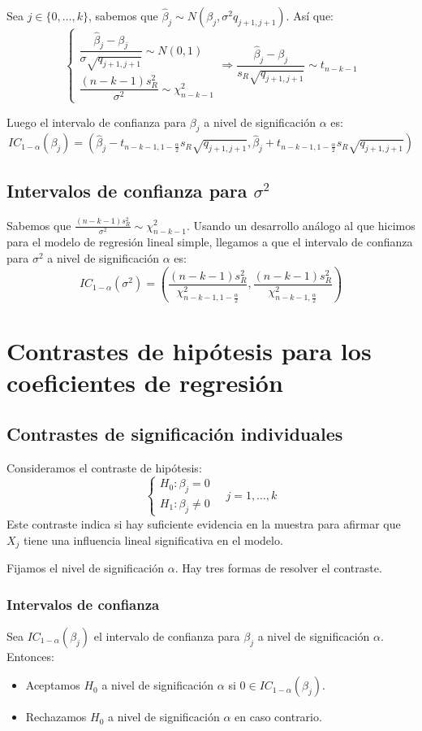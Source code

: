 Sea $j \in \{0, \dots, k\}$, sabemos que $\hat{\beta}_j \sim N(\beta_j, \sigma^2 q_{j+1, j+1})$.
Así que:
$$\begin{cases}
        \dfrac{\hat{\beta}_j - \beta_j}{\sigma \sqrt{q_{j+1, j+1}}} \sim N(0, 1) \\
        \dfrac{(n-k-1)s_R^2}{\sigma^2} \sim \chi^2_{n-k-1}
    \end{cases} \Rightarrow \frac{\hat{\beta}_j - \beta_j}{s_R \sqrt{q_{j+1, j+1}}} \sim t_{n-k-1}$$

Luego el intervalo de confianza para $\beta_j$ a nivel de significación $\alpha$ es:
$$IC_{1-\alpha}(\beta_j) = \left( \hat{\beta}_j - t_{n-k-1, 1-\frac{\alpha}{2}} s_R \sqrt{q_{j+1, j+1}}, \hat{\beta}_j + t_{n-k-1, 1-\frac{\alpha}{2}} s_R \sqrt{q_{j+1, j+1}} \right)$$

\subsection*{Intervalos de confianza para $\sigma^2$}
Sabemos que $\frac{(n-k-1)s_R^2}{\sigma^2} \sim \chi^2_{n-k-1}$.
Usando un desarrollo análogo al que hicimos para el modelo de regresión lineal simple, llegamos a que el intervalo de confianza para $\sigma^2$ a nivel de significación $\alpha$ es:
$$IC_{1-\alpha}(\sigma^2) = \left( \frac{(n-k-1)s_R^2}{\chi^2_{n-k-1, 1-\frac{\alpha}{2}}}, \frac{(n-k-1)s_R^2}{\chi^2_{n-k-1, \frac{\alpha}{2}}} \right)$$

\section{Contrastes de hipótesis para los coeficientes de regresión}
\subsection*{Contrastes de significación individuales}
Consideramos el contraste de hipótesis:
$$\begin{cases}
        H_0: \beta_j = 0 \\
        H_1: \beta_j \neq 0
    \end{cases} \quad j = 1, \dots, k$$
Este contraste indica si hay suficiente evidencia en la muestra para afirmar que $X_j$ tiene una influencia lineal significativa en el modelo.

Fijamos el nivel de significación $\alpha$.
Hay tres formas de resolver  el contraste.

\subsubsection*{Intervalos de confianza}
Sea $IC_{1-\alpha}(\beta_j)$ el intervalo de confianza para $\beta_j$ a nivel de significación $\alpha$.
Entonces:
\begin{itemize}
    \item Aceptamos $H_0$ a nivel de significación $\alpha$ si $0 \in IC_{1-\alpha}(\beta_j)$.
    \item Rechazamos $H_0$ a nivel de significación $\alpha$ en caso contrario.
\end{itemize}

